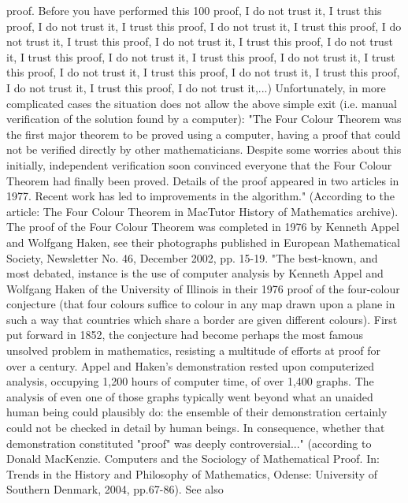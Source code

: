 proof. Before you have performed this 100%
proof, I do not trust it, I trust this proof, I do not trust it, I trust this proof, I do not trust it, I trust this proof, I do not trust it, I
trust this proof, I do not trust it, I trust this proof, I do not trust it, I trust this proof, I do not trust it, I trust this proof, I do not
trust it, I trust this proof, I do not trust it, I trust this proof, I do not trust it, I trust this proof, I do not trust it, I trust this proof, I
do not trust it,...)
Unfortunately, in more complicated cases the situation does not allow the above simple exit (i.e. manual verification of the
solution found by a computer):
"The Four Colour Theorem was the first major theorem to be proved using a computer, having a proof that could not be
verified directly by other mathematicians. Despite some worries about this initially, independent verification soon convinced
everyone that the Four Colour Theorem had finally been proved. Details of the proof appeared in two articles in 1977. Recent
work has led to improvements in the algorithm." (According to the article: The Four Colour Theorem in MacTutor History of
Mathematics archive).
The proof of the Four Colour Theorem was completed in 1976 by Kenneth Appel and Wolfgang Haken, see their photographs
published in European Mathematical Society, Newsletter No. 46, December 2002, pp. 15-19.
"The best-known, and most debated, instance is the use of computer analysis by Kenneth Appel and Wolfgang Haken of the
University of Illinois in their 1976 proof of the four-colour conjecture (that four colours suffice to colour in any map drawn
upon a plane in such a way that countries which share a border are given different colours). First put forward in 1852, the
conjecture had become perhaps the most famous unsolved problem in mathematics, resisting a multitude of efforts at proof for
over a century. Appel and Haken's demonstration rested upon computerized analysis, occupying 1,200 hours of computer time,
of over 1,400 graphs. The analysis of even one of those graphs typically went beyond what an unaided human being could
plausibly do: the ensemble of their demonstration certainly could not be checked in detail by human beings. In consequence,
whether that demonstration constituted "proof" was deeply controversial..." (according to
Donald MacKenzie. Computers and the Sociology of Mathematical Proof. In: Trends in the History and Philosophy of
Mathematics, Odense: University of Southern Denmark, 2004, pp.67-86).
See also
